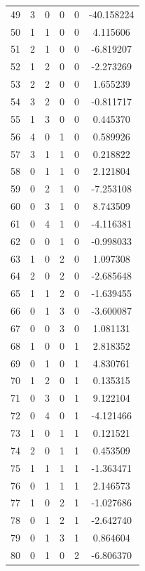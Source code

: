 \documentclass[preprint,12pt]{elsarticle}
\begin{document}
\begin{table}
\begin{minipage}[h!]{0.23\textwidth}
{\begin{tabular}{|c|ccccc|}
49 &   3 &   0 &   0 &   0 & -40.158224 \\
50 &   1 &   1 &   0 &   0 &   4.115606 \\
51 &   2 &   1 &   0 &   0 &  -6.819207 \\
52 &   1 &   2 &   0 &   0 &  -2.273269 \\
53 &   2 &   2 &   0 &   0 &   1.655239 \\
54 &   3 &   2 &   0 &   0 &  -0.811717 \\
55 &   1 &   3 &   0 &   0 &   0.445370 \\
56 &   4 &   0 &   1 &   0 &   0.589926 \\
57 &   3 &   1 &   1 &   0 &   0.218822 \\
58 &   0 &   1 &   1 &   0 &   2.121804 \\
59 &   0 &   2 &   1 &   0 &  -7.253108 \\
60 &   0 &   3 &   1 &   0 &   8.743509 \\
61 &   0 &   4 &   1 &   0 &  -4.116381 \\
62 &   0 &   0 &   1 &   0 &  -0.998033 \\
63 &   1 &   0 &   2 &   0 &   1.097308 \\
64 &   2 &   0 &   2 &   0 &  -2.685648 \\
65 &   1 &   1 &   2 &   0 &  -1.639455 \\
66 &   0 &   1 &   3 &   0 &  -3.600087 \\
67 &   0 &   0 &   3 &   0 &   1.081131 \\
68 &   1 &   0 &   0 &   1 &   2.818352 \\
69 &   0 &   1 &   0 &   1 &   4.830761 \\
70 &   1 &   2 &   0 &   1 &   0.135315 \\
71 &   0 &   3 &   0 &   1 &   9.122104 \\
72 &   0 &   4 &   0 &   1 &  -4.121466 \\
73 &   1 &   0 &   1 &   1 &   0.121521 \\
74 &   2 &   0 &   1 &   1 &   0.453509 \\
75 &   1 &   1 &   1 &   1 &  -1.363471 \\
76 &   0 &   1 &   1 &   1 &   2.146573 \\
77 &   1 &   0 &   2 &   1 &  -1.027686 \\
78 &   0 &   1 &   2 &   1 &  -2.642740 \\
79 &   0 &   1 &   3 &   1 &   0.864604 \\
80 &   0 &   1 &   0 &   2 &  -6.806370 \\

\end{tabular}}
\end{minipage}
\end{table}
\end{document}
